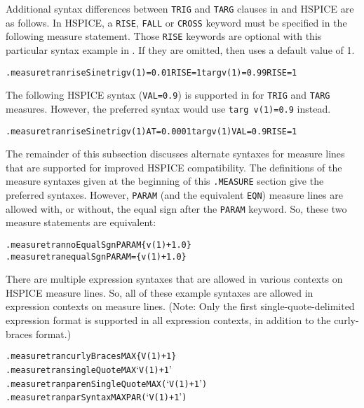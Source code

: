 Additional syntax differences between {\tt TRIG} and {\tt TARG} clauses in \Xyce{}
and HSPICE are as follows.  In HSPICE, a {\tt RISE}, {\tt FALL} or {\tt CROSS} keyword 
must be specified in the  following measure statement.  Those {\tt RISE} keywords are optional 
with this particular syntax example in \Xyce{}.  If they are omitted, then \Xyce{} uses
a default value of 1.
\begin{alltt}
.measure tran riseSine trig v(1)=0.01 RISE=1 targ v(1)=0.99 RISE=1
\end{alltt}
The following HSPICE syntax ({\tt VAL=0.9}) is supported in \Xyce{} for {\tt TRIG} and {\tt TARG}
measures. However, the preferred \Xyce{} syntax would use {\tt targ v(1)=0.9} instead.  
\begin{alltt}
.measure tran riseSine trig v(1) AT=0.0001 targ v(1) VAL=0.9 RISE=1
\end{alltt}

The remainder of this subsection discusses alternate syntaxes for \Xyce{} measure lines
that are supported for improved HSPICE compatibility.  The definitions of the measure 
syntaxes given at the beginning of this \texttt{.MEASURE} section give the preferred 
\Xyce{} syntaxes.  However, \texttt{PARAM} (and the equivalent \texttt{EQN}) measure lines 
are allowed with, or without, the  equal sign after the \texttt{PARAM} keyword.  So, 
these two \Xyce{} measure statements are equivalent:
\begin{alltt}
.measure tran noEqualSgn PARAM \{v(1)+1.0\}
.measure tran equalSgn PARAM=\{v(1)+1.0\}
\end{alltt}

There are multiple expression syntaxes that are allowed in various contexts on
HSPICE measure lines.  So, all of these example syntaxes are allowed in expression
contexts on \Xyce{} measure lines.  (Note: Only the first single-quote-delimited 
expression format is supported in all \Xyce{} expression contexts, in addition to
the \Xyce{} curly-braces format.)
\begin{alltt}
.measure tran curlyBraces MAX \{V(1)+1\}
.measure tran singleQuote MAX `V(1)+1'
.measure tran parenSingleQuote MAX (`V(1)+1')
.measure tran parSyntax MAX PAR(`V(1)+1')
\end{alltt}


